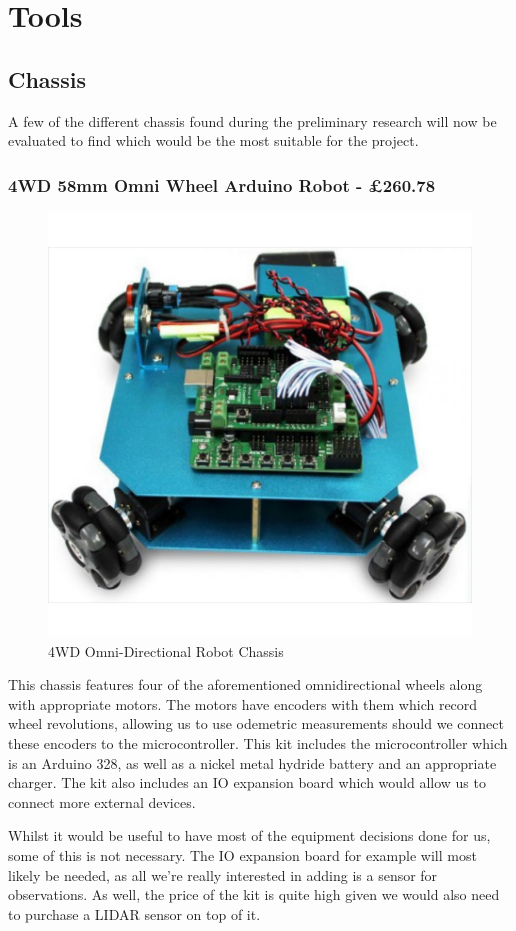 			\section{Tools}
				\subsection{Chassis}
					A few of the different chassis found during the preliminary research will now be evaluated to find which would be the most suitable for the project.
					
					\subsubsection{4WD 58mm Omni Wheel Arduino Robot - \pounds{260.78}}
					\begin{figure}[h]
						\centering
						\includegraphics[width=.3\linewidth]{ANALYSIS/4wdomnidirectionalarduino.jpg}
						\caption{4WD Omni-Directional Robot Chassis}
						\label{4WD Omni-Directional Robot Chassis}
					\end{figure}
					This chassis features four of the aforementioned omnidirectional wheels along with appropriate motors. The motors have encoders with them which record wheel revolutions, allowing us to use odemetric measurements should we connect these encoders to the microcontroller. This kit includes the microcontroller which is an Arduino 328, as well as a nickel metal hydride battery and an appropriate charger. The kit also includes an IO expansion board which would allow us to connect more external devices. 
					
					Whilst it would be useful to have most of the equipment decisions done for us, some of this is not necessary. The IO expansion board for example will most likely be needed, as all we're really interested in adding is a sensor for observations. As well, the price of the kit is quite high given we would also need to purchase a LIDAR sensor on top of it.
					

